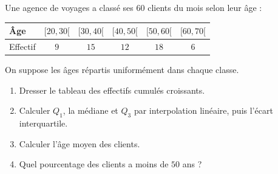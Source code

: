 
\newcommand{\R}{\mathbb{R}}
\newcommand{\vect}[1]{\overrightarrow{#1}}

Une agence de voyages a classé ses $60$ clients du mois selon leur âge :
\begin{center}
\begin{tabular}{|l|c|c|c|c|c|}\hline
Âge & $[20,30[$ & $[30,40[$ & $[40,50[$ & $[50,60[$ & $[60,70[$ \\\hline
Effectif & $9$ & $15$ & $12$ & $18$ & $6$ \\\hline
\end{tabular}\end{center}
On suppose les âges répartis uniformément dans chaque classe.
\begin{enumerate}
  \item Dresser le tableau des effectifs cumulés croissants.
  \item Calculer $Q_1$, la médiane et $Q_3$ par interpolation linéaire, puis l'écart interquartile.
  \item Calculer l'âge moyen des clients.
  \item Quel pourcentage des clients a moins de $50$ ans ?
\end{enumerate}

